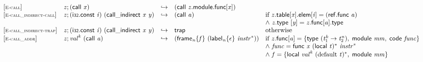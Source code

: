 \vspace{1ex}

$$
\begin{array}{@{}l@{}lcl@{}l@{}}
{[\textsc{\scriptsize E{-}call}]} \quad & {\mathit{z}} ; (\mathsf{call}~{\mathit{x}}) &\hookrightarrow& (\mathsf{call}~{\mathit{z}}.\mathsf{module}.\mathsf{func}{}[{\mathit{x}}]) &  \\
{[\textsc{\scriptsize E{-}call\_indirect{-}call}]} \quad & {\mathit{z}} ; (\mathsf{i{\scriptstyle32}}.\mathsf{const}~{\mathit{i}})~(\mathsf{call\_indirect}~{\mathit{x}}~{\mathit{y}}) &\hookrightarrow& (\mathsf{call}~{\mathit{a}}) &\quad
  \mbox{if}~{{\mathit{z}}.\mathsf{table}}{{}[{\mathit{x}}]}.\mathsf{elem}{}[{\mathit{i}}] = (\mathsf{ref.func}~{\mathit{a}}) \\
 &&&&\quad {\land}~{\mathit{z}}.\mathsf{type}~{}[{\mathit{y}}] = {\mathit{z}}.\mathsf{func}{}[{\mathit{a}}].\mathsf{type} \\
{[\textsc{\scriptsize E{-}call\_indirect{-}trap}]} \quad & {\mathit{z}} ; (\mathsf{i{\scriptstyle32}}.\mathsf{const}~{\mathit{i}})~(\mathsf{call\_indirect}~{\mathit{x}}~{\mathit{y}}) &\hookrightarrow& \mathsf{trap} &\quad
  \mbox{otherwise} \\
{[\textsc{\scriptsize E{-}call\_addr}]} \quad & {\mathit{z}} ; {{\mathit{val}}^{{\mathit{k}}}}~(\mathsf{call}~{\mathit{a}}) &\hookrightarrow& ({{\mathsf{frame}}_{{\mathit{n}}}}{\{{\mathit{f}}\}}~({{\mathsf{label}}_{{\mathit{n}}}}{\{\epsilon\}}~{{\mathit{instr}}^\ast})) &\quad
  \mbox{if}~{\mathit{z}}.\mathsf{func}{}[{\mathit{a}}] = \{ \begin{array}[t]{@{}l@{}}
\mathsf{type}~({{\mathit{t}}_{{1}}^{{\mathit{k}}}} \rightarrow {{\mathit{t}}_{{2}}^{{\mathit{n}}}}),\; \mathsf{module}~{\mathit{mm}},\; \mathsf{code}~{\mathit{func}} \}\end{array} \\
 &&&&\quad {\land}~{\mathit{func}} = \mathsf{func}~{\mathit{x}}~{(\mathsf{local}~{\mathit{t}})^\ast}~{{\mathit{instr}}^\ast} \\
 &&&&\quad {\land}~{\mathit{f}} = \{ \begin{array}[t]{@{}l@{}}
\mathsf{local}~{{\mathit{val}}^{{\mathit{k}}}}~{({\mathrm{default}}~{\mathit{t}})^\ast},\; \mathsf{module}~{\mathit{mm}} \}\end{array} \\
\end{array}
$$

\vspace{1ex}

